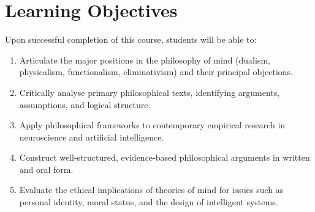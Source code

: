 \section{Learning Objectives}

Upon successful completion of this course, students will be able to:

\begin{enumerate}[leftmargin=*, label=\textbf{\arabic*.}, itemsep=2pt]
  \item Articulate the major positions in the philosophy of mind (dualism, physicalism,
        functionalism, eliminativism) and their principal objections.
  \item Critically analyse primary philosophical texts, identifying arguments, assumptions,
        and logical structure.
  \item Apply philosophical frameworks to contemporary empirical research in neuroscience
        and artificial intelligence.
  \item Construct well-structured, evidence-based philosophical arguments in written and
        oral form.
  \item Evaluate the ethical implications of theories of mind for issues such as
        personal identity, moral status, and the design of intelligent systems.
\end{enumerate}

